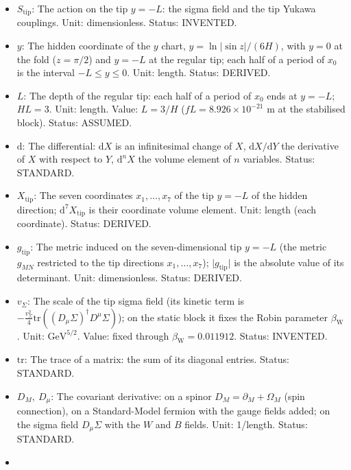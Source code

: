 \documentclass[
  10pt,
]{article}
\providecommand{\tightlist}{%
  \setlength{\itemsep}{0pt}\setlength{\parskip}{0pt}}
\begin{document}
\begin{itemize}
\tightlist
\item
  \(S_{\mathrm{tip}}\): The action on the tip \(y = -L\): the sigma
  field and the tip Yukawa couplings. Unit: dimensionless. Status:
  INVENTED.
\item
  \(y\): The hidden coordinate of the \(y\) chart,
  \(y = \ln\lvert\sin z\rvert/(6H)\), with \(y = 0\) at the fold
  (\(z = \pi/2\)) and \(y = -L\) at the regular tip; each half of a
  period of \(x_0\) is the interval \(-L \le y \le 0\). Unit: length.
  Status: DERIVED.
\item
  \(L\): The depth of the regular tip: each half of a period of \(x_0\)
  ends at \(y = -L\); \(HL = 3\). Unit: length. Value: \(L = 3/H\)
  (\(fL = 8.926\times10^{-21}\) m at the stabilised block). Status:
  ASSUMED.
\item
  \(\mathrm{d}\): The differential: \(\mathrm{d}X\) is an infinitesimal
  change of \(X\), \(\mathrm{d}X/\mathrm{d}Y\) the derivative of \(X\)
  with respect to \(Y\), \(\mathrm{d}^nX\) the volume element of \(n\)
  variables. Status: STANDARD.
\item
  \(X_{\mathrm{tip}}\): The seven coordinates \(x_1, \dots, x_7\) of the
  tip \(y = -L\) of the hidden direction;
  \(\mathrm{d}^7X_{\mathrm{tip}}\) is their coordinate volume element.
  Unit: length (each coordinate). Status: DERIVED.
\item
  \(g_{\mathrm{tip}}\): The metric induced on the seven-dimensional tip
  \(y = -L\) (the metric \(g_{MN}\) restricted to the tip directions
  \(x_1, \dots, x_7\)); \(\lvert g_{\mathrm{tip}}\rvert\) is the
  absolute value of its determinant. Unit: dimensionless. Status:
  DERIVED.
\item
  \(v_\Sigma\): The scale of the tip sigma field (its kinetic term is
  \(-\frac{v_\Sigma^2}{4}\mathrm{tr}((D_\mu\Sigma)^\dagger D^\mu\Sigma)\));
  on the static block it fixes the Robin parameter
  \(\beta_{\mathrm{W}}\). Unit: \(\mathrm{GeV}^{5/2}\). Value: fixed
  through \(\beta_{\mathrm{W}} = 0.011912\). Status: INVENTED.
\item
  \(\mathrm{tr}\): The trace of a matrix: the sum of its diagonal
  entries. Status: STANDARD.
\item
  \(D_M,\ D_\mu\): The covariant derivative: on a spinor
  \(D_M = \partial_M + \Omega_M\) (spin connection), on a Standard-Model
  fermion with the gauge fields added; on the sigma field
  \(D_\mu\Sigma\) with the \(W\) and \(B\) fields. Unit: 1/length.
  Status: STANDARD.
\item

\end{itemize}
\end{document}
